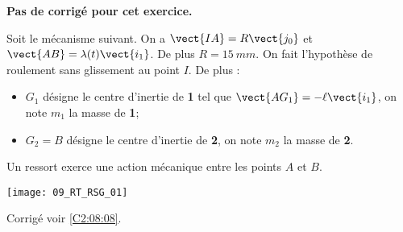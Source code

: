 \normalfalse \difficiletrue \tdifficilefalse
\correctionfalse


\setcounter{numques}{0}
\ifcorrection
\else
\textbf{Pas de corrigé pour cet exercice.}
\fi

\ifprof
\else
Soit le mécanisme suivant. On a $\vect{IA}=R\vect{j_0}$ et $\vect{AB}=\lambda(t)\vect{i_1}$. De plus $R=\SI{15}{mm}$.
On fait l'hypothèse de roulement sans glissement au point $I$. De plus :
\begin{itemize}
\item $G_1$ désigne le centre d'inertie de \textbf{1} tel que $\vect{AG_1}=-\ell\vect{i_1}$, on note $m_1$ la masse de \textbf{1};%
\item $G_2=B$ désigne le centre d'inertie de \textbf{2}, on note $m_2$ la masse de \textbf{2}.%
\end{itemize}
Un ressort exerce une action mécanique entre les points $A$ et $B$. 
\begin{center}
\texttt{[image: 09\_RT\_RSG\_01]}
\end{center}
\fi

\ifprof
\else
\fi

\ifprof
\else
\fi

\ifprof
\else
\begin{flushright}
\footnotesize{Corrigé  voir \ref{C2:08:08}.}
\end{flushright}%
\fi